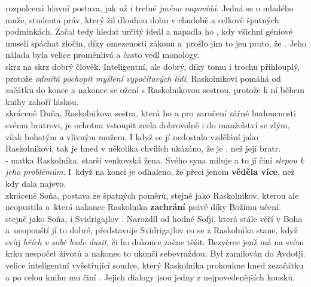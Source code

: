 \documentclass{extarticle} %
\begin{document}
\noindent 
{} rozpolcená hlavní postava, jak už i trefné \textit{jméno napovídá}.
Jedná se o mladého muže, studenta práv, který žil dlouhou dobu v chudobě a celkově špatných podmínkách.
Začal tedy hledat určitý ideál a napadla ho , kdy všichni géniové museli spáchat zločin, díky omezenosti zákonů a~prošlo jim to jen proto, že .
Jeho nálada byla velice proměnlivá a často vedl monology. \\
 skrz na skrz dobrý člověk.
Inteligentní, ale dobrý, díky tomu i trochu přihlouplý, protože \textit{odmítá pochopit myšlení vypočítavých lidí}.
Raskolnikovi pomáhá od začátku do konce a nakonec se ožení s Raskolnikovou sestrou, protože k ní během knihy zahoří láskou. \\
 zkráceně Duňa, Raskolnikova sestra, která ho  a pro zaručení zářné budoucnosti svému bratrovi, je ochotna vstoupit zcela dobrovolně i do manželství se zlým, však bohatým a vlivným mužem.
I když se jí nedostalo vzdělání jako Raskolnikovi, tak je hned v několika chvílích ukázáno, že je , než její bratr. \\
 - matka Raskolnika, starší venkovská žena.
Svého syna miluje a to jí činí \textit{slepou k jeho problémům}.
I~když na konci je odhaleno, že přeci jenom \textbf{věděla více}, než kdy dala najevo. \\
 zkráceně Soňa, postava ze špatných poměrů, stejně jako Raskolnikov, kterou ale neopustila  a~která nakonec Raskolnika \textbf{zachrání} právě díky Božímu učení. \\
 stejně jako Soňa, i Svidrigajlov .
Narozdíl od hodné Sofji, která stále věří v Boha a~neopouští jí to dobré, představuje Svidrigajlov co se z Raskolnika stane, když svůj \textit{hřích v sobě bude dusit}, či ho dokonce začne těšit.
Bezvěrec jenž má na svém krku nespočet životů a nakonec to ukončí sebevraždou.
Byl zamilován do Avdoťji. \\
 velice inteligentní vyšetřující soudce, který Raskolnika prokoukne hned zezačátku a po celou knihu mu činí .
Jejich dialogy jsou jedny z nejpovedenějších kousků.
\end{document}
